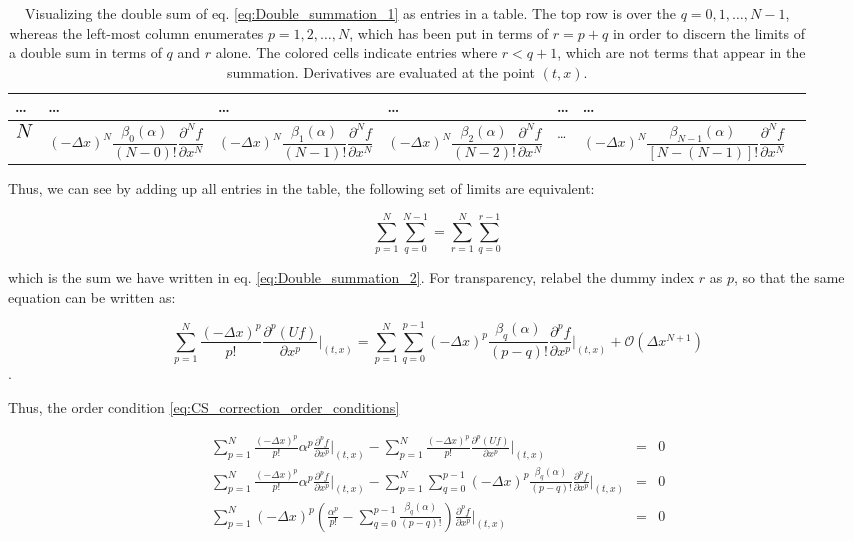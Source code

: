 \documentclass[11pt,titlepage]{report}
\begin{document}
\begin{landscape}
\begin{table}[h!]
\begin{tabular}{|M{4cm}|M{4cm}|M{4cm}|M{4cm}|M{0.4cm}|M{5cm}|N}
 \ldots & \ldots & \ldots & \ldots & \ldots  & \ldots &\\[25pt] \hline

$\mathlarger{\mathlarger{\mathlarger{N}}}$ & $$(-\Delta x)^N\frac{\beta_0(\alpha )}{(N - 0)!}\frac{\partial^N f}{\partial x^N}$$ &  $$(-\Delta x)^N\frac{\beta_1(\alpha )}{(N - 1)!}\frac{\partial^N f}{\partial x^N}$$ &  $$(-\Delta x)^N\frac{\beta_2(\alpha )}{(N - 2)!}\frac{\partial^N f}{\partial x^N}$$ & \ldots &$$(-\Delta x)^N\frac{\beta_{N-1}(\alpha )}{[N - (N - 1)]!}\frac{\partial^N f}{\partial x^N}$$ &\\[25pt] \hline

\end{tabular}
  \caption{Visualizing the double sum of eq. \eqref{eq:Double_summation_1} as entries in a table. The top row is over the $q = 0, 1, \ldots , N-1$, whereas the left-most column enumerates $p = 1, 2, \ldots, N$, which has been put in terms of $r = p + q$ in order to discern the limits of a double sum in terms of $q$ and $r$ alone. The colored cells indicate entries where $r < q + 1$, which are not terms that appear in the summation. Derivatives are evaluated at the point $(t,x)$.}
\end{table}
\end{landscape}

Thus, we can see by adding up all entries in the table, the following set of limits are equivalent:

$$\sum_{p = 1}^N\sum_{q = 0}^{N-1} = \sum_{r = 1}^N\sum_{q = 0}^{r-1} $$

\noindent which is the sum we have written in eq. \eqref{eq:Double_summation_2}. For transparency, relabel the dummy index $r$ as $p$, so that the same equation can be written as:

$$\sum_{p = 1}^{N} \frac{(-\Delta x)^p}{p!}\frac{\partial^p(Uf)}{\partial x^p}\biggr|_{(t,x)}  =  \sum_{p = 1}^{N}\sum_{q = 0}^{p-1}(-\Delta x)^p\frac{\beta_q(\alpha )}{(p - q)!} \frac{\partial^p f}{\partial x^p}\biggr|_{(t,x)} + \mathcal{O}(\Delta x^{N+1})$$.

\noindent Thus, the order condition \eqref{eq:CS_correction_order_conditions}

\begin{eqnarray*} \sum_{p = 1}^{N} \frac{(-\Delta x)^p}{p!} \alpha^p \frac{\partial^p f}{\partial x^p}\biggr|_{(t,x)} - \sum_{p = 1}^{N} \frac{(-\Delta x)^p}{p!}\frac{\partial^p(Uf)}{\partial x^p}\biggr|_{(t,x)} & = &  0\\[0.3em]
 \sum_{p = 1}^{N} \frac{(-\Delta x)^p}{p!}\alpha^p \frac{\partial^p f}{\partial x^p}\biggr|_{(t,x)} - \sum_{p = 1}^{N}\sum_{q = 0}^{p-1}(-\Delta x)^p\frac{\beta_q(\alpha )}{(p - q)!} \frac{\partial^p f}{\partial x^p}\biggr|_{(t,x)}   & = & 0\\[0.3em]
  \sum_{p = 1}^{N} (-\Delta x)^p\left(\frac{\alpha^p}{p!}  - \sum_{q = 0}^{p-1}\frac{\beta_q(\alpha )}{(p - q)!}\right)\frac{\partial^p f}{\partial x^p}\biggr|_{(t,x)}  & = & 0
\end{eqnarray*}\\[0.1em]
\end{document}
